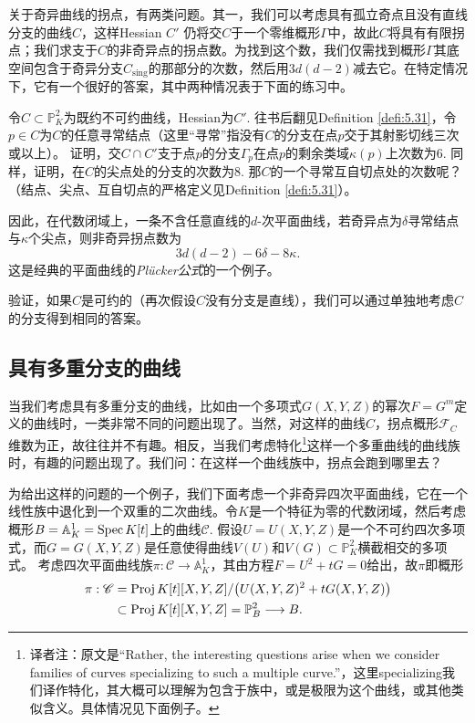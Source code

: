 
关于奇异曲线的拐点，有两类问题。其一，我们可以考虑具有孤立奇点且没有直线分支的曲线$C$，这样Hessian $C'$ 仍将交$C$于一个零维概形$\Gamma$中，故此$C$将具有有限拐点；我们求支于$C$的非奇异点的拐点数。为找到这个数，我们仅需找到概形$\Gamma$其底空间包含于奇异分支$C_{\text{sing}}$的那部分的次数，然后用$3d(d-2)$减去它。在特定情况下，它有一个很好的答案，其中两种情况表于下面的练习中。

\begin{exe}\label{exe:4.8}
	令$C\subset \mathbb P_K^2$为既约不可约曲线，Hessian为$C'$. 往书后翻见Definition \ref{defi:5.31}，令$p\in C$为$C$的任意寻常结点（这里“寻常”指没有$C$的分支在点$p$交于其射影切线三次或以上）。
	证明，交$C\cap C'$支于点$p$的分支$\Gamma_p$在点$p$的剩余类域$\kappa(p)$上次数为$6$. 同样，证明，在$C$的尖点处的分支的次数为$8$. 那$C$的一个寻常互自切点处的次数呢？（结点、尖点、互自切点的严格定义见Definition \ref{defi:5.31}）。
\end{exe}

因此，在代数闭域上，一条不含任意直线的$d$-次平面曲线，若奇异点为$\delta$寻常结点与$\kappa$个尖点，则非奇异拐点数为
\[
	3d(d-2)-6\delta -8\kappa.
\]
这是经典的平面曲线的\textit{Pl\"ucker公式}的一个例子。

\begin{exe}\label{exe:4.9}
	验证，如果$C$是可约的（再次假设$C$没有分支是直线），我们可以通过单独地考虑$C$的分支得到相同的答案。
\end{exe}

\subsection{具有多重分支的曲线}\label{s:4.1.3}

当我们考虑具有多重分支的曲线，比如由一个多项式$G(X,Y,Z)$的幂次$F=G^m$定义的曲线时，一类非常不同的问题出现了。当然，对这样的曲线$C$，拐点概形$\mathscr F_C$维数为正，故往往并不有趣。相反，当我们考虑特化\footnote{译者注：原文是``Rather, the interesting questions arise when we consider families of curves specializing to such a multiple curve.''，这里specializing我们译作特化，其大概可以理解为包含于族中，或是极限为这个曲线，或其他类似含义。具体情况见下面例子。}这样一个多重曲线的曲线族时，有趣的问题出现了。我们问：在这样一个曲线族中，拐点会跑到哪里去？

为给出这样的问题的一个例子，我们下面考虑一个非奇异四次平面曲线，它在一个线性族中退化到一个双重的二次曲线。令$K$是一个特征为零的代数闭域，然后考虑概形$B=\mathbb A_K^1=\operatorname{Spec} K[t]$上的曲线$\mathscr C$. 假设$U=U(X,Y,Z)$是一个不可约四次多项式，而$G=G(X,Y,Z)$是任意使得曲线$V(U)$和$V(G)\subset \mathbb P_K^2$横截相交的多项式。
考虑四次平面曲线族$\pi:\mathscr C\to \mathbb A_K^1$，其由方程$F=U^2+tG=0$给出，故$\pi$即概形
\[
	\begin{aligned}
	\pi:\mathscr C&=\operatorname{Proj} K[t][X,Y,Z]/\bigl(U(X,Y,Z)^2+tG(X,Y,Z)\bigr)\\
	&\subset \operatorname{Proj} K[t][X,Y,Z]=\mathbb P_B^2\longrightarrow B.
	\end{aligned}
\]


